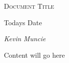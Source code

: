 \documentclass[letterpaper,12pt]{article}
\begin{document}
\begin{titlepage}
	\centering
	{\scshape\LARGE Document Title \par}
	\vspace{1cm}
	{\large Todays Date\par}
	\vspace{1.5cm}
	{\Large\itshape Kevin Muncie\par}
	\vfill

\end{titlepage}

Content will go here
\end{document}
